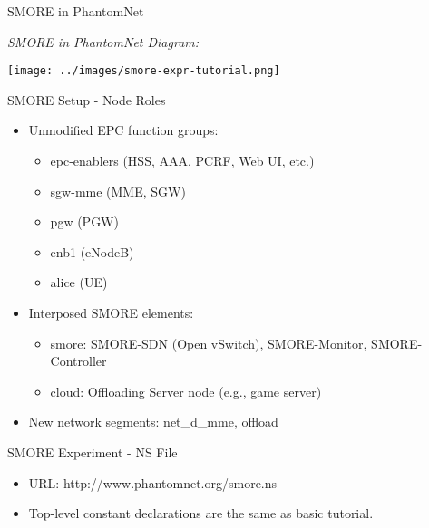 \documentclass[xcolor=pdftex,dvipsnames,table]{beamer}
\begin{document}
\begin{frame}{SMORE in PhantomNet}
  \centerline{\emph{SMORE in PhantomNet Diagram:}}
  \vspace{0.1in}
  \centerline{\texttt{[image: ../images/smore-expr-tutorial.png]}}
\end{frame}

\begin{frame}{SMORE Setup - Node Roles}
  \begin{itemize}
    \item Unmodified EPC function groups:
      \begin{itemize}
      \item epc-enablers (HSS, AAA, PCRF, Web UI, etc.)
      \item sgw-mme (MME, SGW)
      \item pgw (PGW)
      \item enb1 (eNodeB)
      \item alice (UE)
      \end{itemize}
    \item Interposed SMORE elements:
      \begin{itemize}
        \item smore: SMORE-SDN (Open vSwitch), SMORE-Monitor, SMORE-Controller
        \item cloud: Offloading Server node (e.g., game server)
      \end{itemize}
    \item New network segments: net\_d\_mme, offload
  \end{itemize}
\end{frame}

\begin{frame}[fragile]{SMORE Experiment - NS File}
  \begin{itemize}
    \item URL: http://www.phantomnet.org/smore.ns
    \item Top-level constant declarations are the same as basic tutorial.
  \end{itemize}
  \colorbox{SkyBlue!20}{\fontsize{2}{3}\selectfont
    \begin{minipage}{\textwidth}
      \begin{alltt}
      
      \end{alltt}
    \end{minipage}
  }
\end{frame}
\end{document}
